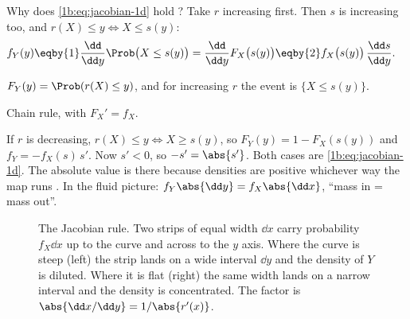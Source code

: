 Why does \eqref{1b:eq:jacobian-1d} hold ?
Take $r$ increasing first. Then $s$ is increasing too, and
$r(X)\le y\iff X\le s(y)$:
\begin{align*}
  f_Y(y)
  &\eqby{1} \frac{\dd}{\dd y}\Prob\bigl(X\le s(y)\bigr)
   = \frac{\dd}{\dd y}F_X\bigl(s(y)\bigr)
   \eqby{2} f_X\bigl(s(y)\bigr)\,\frac{\dd s}{\dd y} .
\end{align*}
\begin{explain}
  \item $F_Y(y)=\Prob(r(X)\le y)$, and for increasing $r$ the event is
        $\{X\le s(y)\}$.
  \item Chain rule, with $F_X'=f_X$.
\end{explain}
If $r$ is decreasing, $r(X)\le y\iff X\ge s(y)$, so $F_Y(y)=1-F_X(s(y))$ and
$f_Y=-f_X(s)\,s'$. Now $s'<0$, so $-s'=\abs{s'}$. Both cases are
\eqref{1b:eq:jacobian-1d}. The absolute value is there because densities are
positive whichever way the map runs . In the
fluid picture: $f_Y\abs{\dd y}=f_X\abs{\dd x}$, ``mass in = mass out''.

\begin{figure}[htbp]
\centering
{}
\caption{The Jacobian rule. Two strips of equal width $\dd x$ carry
probability $f_X\dd x$ up to the curve and across to the $y$ axis. Where the
curve is steep (left) the strip lands on a wide interval $\dd y$ and the
density of $Y$ is diluted. Where it is flat (right) the same width lands on a
narrow interval and the density is concentrated. The factor is
$\abs{\dd x/\dd y}=1/\abs{r'(x)}$.}
\label{1b:fig:jacobian-strip}
\end{figure}

